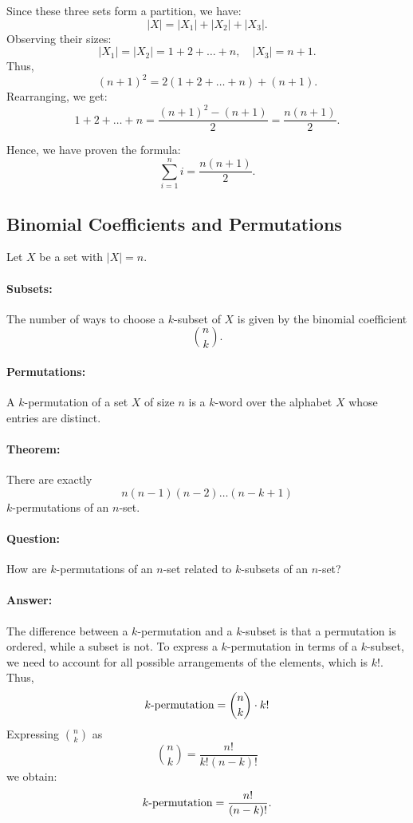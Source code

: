 \documentclass{article}
\begin{document}
Since these three sets form a partition, we have:  
\[
|X| = |X_1| + |X_2| + |X_3|.
\]  
Observing their sizes:  
\[
|X_1| = |X_2| = 1 + 2 + \dots + n, \quad |X_3| = n+1.
\]  
Thus,  
\[
(n+1)^2 = 2(1 + 2 + \dots + n) + (n+1).
\]  
Rearranging, we get:  
\[
1 + 2 + \dots + n = \frac{(n+1)^2 - (n+1)}{2} = \frac{n(n+1)}{2}.
\]

Hence, we have proven the formula:  
\[
\sum_{i=1}^{n} i = \frac{n(n+1)}{2}.
\]


\subsection{Binomial Coefficients and Permutations}
Let $X$ be a set with $|X| = n$.

\paragraph{Subsets:}  
The number of ways to choose a $k$-subset of $X$ is given by the binomial coefficient
\[
\binom{n}{k}.
\]

\paragraph{Permutations:}  
A \( k \)-permutation of a set \( X \) of size \( n \) is a \( k \)-word over the alphabet \( X \) whose entries are distinct.  

\paragraph{Theorem:}  
There are exactly  
\[
n (n-1) (n-2) \dots (n-k+1)
\]  
\( k \)-permutations of an \( n \)-set.  

\paragraph{Question:}  
How are \( k \)-permutations of an \( n \)-set related to \( k \)-subsets of an \( n \)-set?  

\paragraph{Answer:}  
The difference between a \( k \)-permutation and a \( k \)-subset is that a permutation is ordered, while a subset is not.  
To express a \( k \)-permutation in terms of a \( k \)-subset, we need to account for all possible arrangements of the elements, which is \( k! \).  
Thus,  
\[
\text{\( k \)-permutation} = \binom{n}{k} \cdot k!
\]
Expressing \( \binom{n}{k} \) as  
\[
\binom{n}{k} = \frac{n!}{k!(n-k)!}
\]  
we obtain:  
\[
\text{\( k \)-permutation} = \frac{n!}{(n-k)!}.
\]
\end{document}
